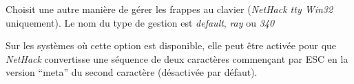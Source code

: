 \documentclass[titlepage]{article}
\begin{document}
\begin{description}[font=\mdseries\itshape]
\item[altkeyhandling]
Choisit une autre manière de gérer les frappes au clavier (\textit{NetHack tty Win32} uniquement).
Le nom du type de gestion est \textit{default}, \textit{ray} ou \textit{340}
\item[altmeta]
Sur les systèmes où cette option est disponible, elle peut être
activée pour que \textit{NetHack} convertisse une séquence de deux caractères commençant
par ESC en la version ``meta'' du second caractère (désactivée par défaut).


\end{description}
\end{document}
